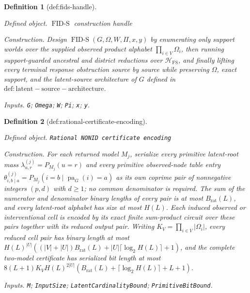 \documentclass{article}
\newtheorem{definition}{Definition}
\begin{document}
\begin{definition}[def:fids-handle]\label{def:fids-handle}
\par\smallskip\noindent\emph{Defined object.} \(\operatorname{FID\text{-}S}\) construction handle
\par\smallskip\noindent\emph{Construction.} Design \(\operatorname{FID\text{-}S}(G,\Omega,W,\Pi,x,y)\) by enumerating only support worlds over the supplied observed product alphabet \(\prod_{i\in V}\Omega_i\), then running support-guarded ancestral and district reductions over \(\mathcal H_{\mathrm{FS}}\), and finally lifting every terminal response obstruction source by source while preserving \(\Omega\), exact support, and the latent-source architecture of \(G\) defined in \(\mathrm{def:latent-source-architecture}\).
\par\smallskip\noindent\emph{Inputs.} \texttt{G}; \texttt{Omega}; \texttt{W}; \texttt{Pi}; \texttt{x}; \texttt{y}.
\end{definition}

\begin{definition}[def:rational-certificate-encoding]\label{def:rational-certificate-encoding}
\par\smallskip\noindent\emph{Defined object.} \texttt{Rational NONID certificate encoding}
\par\smallskip\noindent\emph{Construction.} For each returned model \(M_j\), serialize every primitive latent-root mass \(\lambda^{(j)}_{u,r}=P_{M_j}(u=r)\) and every primitive observed-node table entry \(\theta^{(j)}_{i,b\mid a}=P_{M_j}(i=b\mid\operatorname{pa}_G(i)=a)\) as its own coprime pair of nonnegative integers \((p,d)\) with \(d\ge 1\); no common denominator is required. The sum of the numerator and denominator binary lengths of every pair is at most \(B_{\mathrm{rat}}(L)\), and every latent-root alphabet has size at most \(H(L)\). Each induced observed or interventional cell is encoded by its exact finite sum-product circuit over these pairs together with its reduced output pair. Writing \(K_V=\prod_{i\in V}|\Omega_i|\), every reduced cell pair has binary length at most \(H(L)^{|U|}((|V|+|U|)B_{\mathrm{rat}}(L)+|U|\lceil\log_2 H(L)\rceil+1)\), and the complete two-model certificate has serialized bit length at most \(8(L+1)K_VH(L)^{2|U|}(B_{\mathrm{rat}}(L)+\lceil\log_2 H(L)\rceil+L+1)\).
\par\smallskip\noindent\emph{Inputs.} \texttt{M}; \texttt{InputSize}; \texttt{LatentCardinalityBound}; \texttt{PrimitiveBitBound}.
\end{definition}
\end{document}

